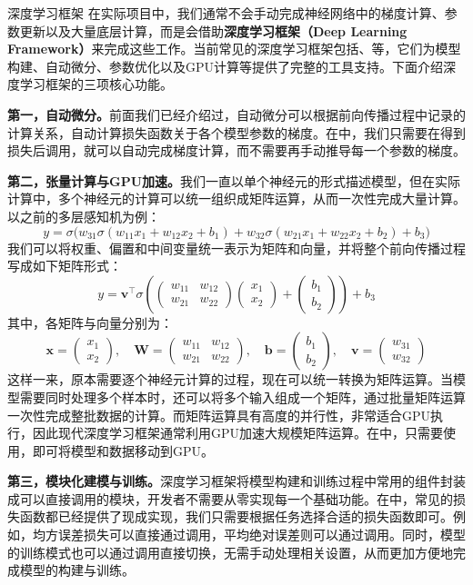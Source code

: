 \begin{purpleBox}{深度学习框架}
在实际项目中，我们通常不会手动完成神经网络中的梯度计算、参数更新以及大量底层计算，而是会借助\textbf{深度学习框架（Deep Learning Framework）}来完成这些工作。当前常见的深度学习框架包括、等，它们为模型构建、自动微分、参数优化以及GPU计算等提供了完整的工具支持。下面介绍深度学习框架的三项核心功能。

\textbf{第一，自动微分。}前面我们已经介绍过，自动微分可以根据前向传播过程中记录的计算关系，自动计算损失函数关于各个模型参数的梯度。在中，我们只需要在得到损失后调用，就可以自动完成梯度计算，而不需要再手动推导每一个参数的梯度。

\textbf{第二，张量计算与GPU加速。}我们一直以单个神经元的形式描述模型，但在实际计算中，多个神经元的计算可以统一组织成矩阵运算，从而一次性完成大量计算。以之前的多层感知机为例：
$$
y=\sigma\big(w_{31}\sigma(w_{11}x_1+w_{12}x_2+b_1)+w_{32}\sigma(w_{21}x_1+w_{22}x_2+b_2)+b_3\big)
$$
我们可以将权重、偏置和中间变量统一表示为矩阵和向量，并将整个前向传播过程写成如下矩阵形式：
$$
y = \mathbf{v}^{\top} \sigma\!\left(
  \begin{pmatrix} w_{11}&w_{12}\\ w_{21}&w_{22} \end{pmatrix}
  \begin{pmatrix} x_1\\ x_2 \end{pmatrix}
  + \begin{pmatrix} b_1\\ b_2 \end{pmatrix}
\right) + b_3
$$
其中，各矩阵与向量分别为：
$$
\mathbf{x}= \begin{pmatrix} x_1\\ x_2 \end{pmatrix},\quad
\mathbf{W}= \begin{pmatrix} w_{11}&w_{12}\\ w_{21}&w_{22} \end{pmatrix},\quad
\mathbf{b}= \begin{pmatrix} b_1\\ b_2 \end{pmatrix},\quad
\mathbf{v}= \begin{pmatrix} w_{31}\\ w_{32} \end{pmatrix}
$$
这样一来，原本需要逐个神经元计算的过程，现在可以统一转换为矩阵运算。当模型需要同时处理多个样本时，还可以将多个输入组成一个矩阵，通过批量矩阵运算一次性完成整批数据的计算。而矩阵运算具有高度的并行性，非常适合GPU执行，因此现代深度学习框架通常利用GPU加速大规模矩阵运算。在中，只需要使用，即可将模型和数据移动到GPU。

\textbf{第三，模块化建模与训练。}深度学习框架将模型构建和训练过程中常用的组件封装成可以直接调用的模块，开发者不需要从零实现每一个基础功能。在中，常见的损失函数都已经提供了现成实现，我们只需要根据任务选择合适的损失函数即可。例如，均方误差损失可以直接通过调用，平均绝对误差则可以通过调用。同时，模型的训练模式也可以通过调用直接切换，无需手动处理相关设置，从而更加方便地完成模型的构建与训练。
\end{purpleBox}

